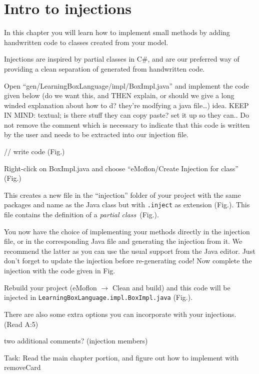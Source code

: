 \newpage
\section{Intro to injections}
\genHeader

In this chapter you will learn how to implement small methods by adding handwritten code to classes created from your model.

Injections are inspired by partial classes in C\#, and are our preferred way of providing a clean separation of generated from handwritten code.

Open ``gen/LearningBoxLanguage/impl/BoxImpl.java'' and implement the code given below {\small (do we want this, and THEN explain, or should we give a long
winded explanation about how to d? they're modfying a java file\ldots) idea. KEEP IN MIND: textual; is there stuff they can copy paste? set it up so they can..}
Do not remove the comment which is necessary to indicate that this code is written by the user and needs to be extracted into our injection file.

// write code (Fig.)

Right-click on BoxImpl.java and choose ``eMoflon/Create Injection for class'' (Fig.) 

This creates a new file in the ``injection'' folder of your project with the same packages and name as the Java class but with \texttt{.inject} as extension
(Fig.). This file contains the definition of a \textit{partial class}~(Fig.).

You now have the choice of implementing your methods directly in the injection file, or in the corresponding Java file and generating the injection from it. We
recommend the latter as you can use the usual support from the Java editor. Just don't forget to update the injection before re-generating code! Now complete
the injection with the code given in Fig.

Rebuild your project (eMoflon $\rightarrow$ Clean and build) and this code will be injected in \texttt{LearningBoxLanguage.impl.BoxImpl.java} (Fig.). 

There are also some extra options you can incorporate with your injections. (Read A:5)

two additional comments? (injection members)

Task: Read the main chapter portion, and figure out how to implement with removeCard